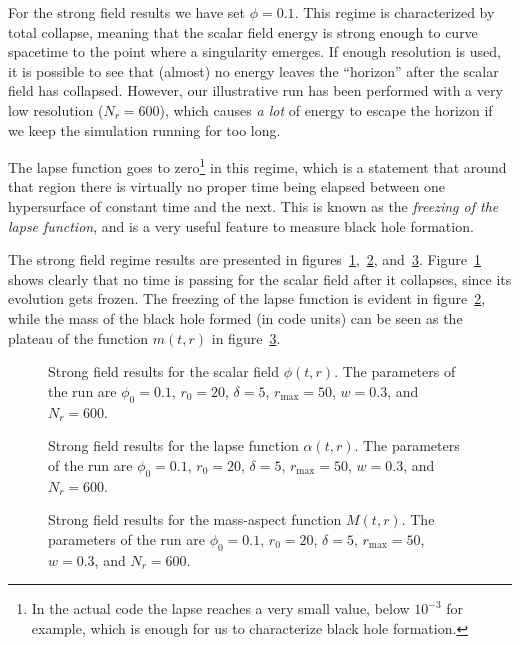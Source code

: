 \documentclass[a4paper,11pt]{article}
\renewcommand{\a}{\alpha}
\begin{document}
For the strong field results we have set $\phi=0.1$. This regime is characterized by total collapse, meaning that the scalar field energy is strong enough to curve spacetime to the point where a singularity emerges. If enough resolution is used, it is possible to see that (almost) no energy leaves the ``horizon'' after the scalar field has collapsed. However, our illustrative run has been performed with a very low resolution ($N_{r}=600$), which causes \emph{a lot} of energy to escape the horizon if we keep the simulation running for too long.

The lapse function goes to zero\footnote{In the actual code the lapse reaches a very small value, below $10^{-3}$ for example, which is enough for us to characterize black hole formation.} in this regime, which is a statement that around that region there is virtually no proper time being elapsed between one hypersurface of constant time and the next. This is known as the \emph{freezing of the lapse function}, and is a very useful feature to measure black hole formation.

The strong field regime results are presented in figures~\ref{fig:phi_strong},~\ref{fig:alpha_strong}, and~\ref{fig:mass_strong}. Figure~\ref{fig:phi_strong} shows clearly that no time is passing for the scalar field after it collapses, since its evolution gets frozen. The freezing of the lapse function is evident in figure~\ref{fig:alpha_strong}, while the mass of the black hole formed (in code units) can be seen as the plateau of the function $m(t,r)$ in figure~\ref{fig:mass_strong}.

\begin{figure}[ht]
  \centering
  
  \caption[Old strong field results for the scalar field $\phi(t,r)$.]{Strong field results for the scalar field $\phi(t,r)$. The parameters of the run are $\phi_{0}=0.1$, $r_{0}=20$, $\delta=5$, $r_{\max}=50$, $w=0.3$, and $N_{r}=600$.}
  \label{fig:phi_strong}
\end{figure}

\begin{figure}[ht]
  \centering
  
  \caption[Old strong field results for the lapse function $\a(t,r)$.]{Strong field results for the lapse function $\a(t,r)$. The parameters of the run are $\phi_{0}=0.1$, $r_{0}=20$, $\delta=5$, $r_{\max}=50$, $w=0.3$, and $N_{r}=600$.}
  \label{fig:alpha_strong}
\end{figure}

\begin{figure}[ht]
  \centering
  
  \caption[Old strong field results for the mass-aspect function $M(t,r)$.]{Strong field results for the mass-aspect function $M(t,r)$. The parameters of the run are $\phi_{0}=0.1$, $r_{0}=20$, $\delta=5$, $r_{\max}=50$, $w=0.3$, and $N_{r}=600$.}
  \label{fig:mass_strong}
\end{figure}
\end{document}
